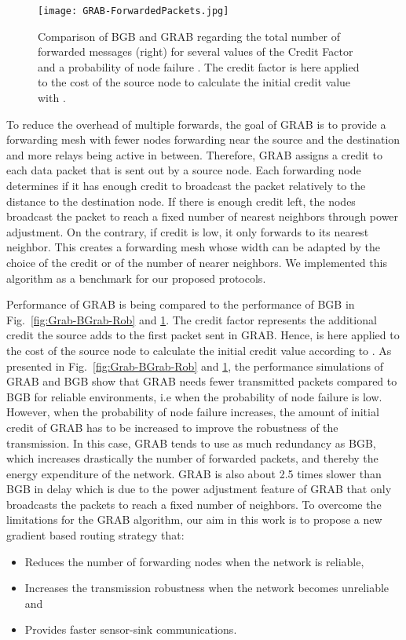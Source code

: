 \documentclass[journal, peerreview, onecolumn, draftcls]{IEEEtran}
\begin{document}
\begin{figure}
    \centering
    \texttt{[image: GRAB-ForwardedPackets.jpg]}
    \caption{Comparison of BGB and GRAB regarding the total number of forwarded messages (right) for several values of the Credit Factor  and a probability of node failure . The credit factor  is here applied to the cost of the source node  to calculate the initial credit value  with .}
    \label{fig:Grab-BGrab-For}
\end{figure}

To reduce the overhead of multiple forwards, the goal of GRAB is to provide a forwarding mesh with fewer nodes forwarding near the source and the destination and more relays being active in between. Therefore, GRAB assigns a credit to each data packet that is sent out by a source node. Each forwarding node determines if it has enough credit to broadcast the packet relatively to the distance to the destination node. If there is enough credit left, the nodes broadcast the packet to reach a fixed number  of nearest neighbors through power adjustment. On the contrary, if credit is low, it only forwards to its nearest neighbor. This creates a forwarding mesh whose width can be adapted by the choice of the credit or of the number of nearer neighbors. We implemented this algorithm as a benchmark for our proposed protocols.

Performance of GRAB is being compared to the performance of BGB in Fig.~\ref{fig:Grab-BGrab-Rob} and \ref{fig:Grab-BGrab-For}. The credit factor  represents the additional credit the source adds to the first packet sent in GRAB. Hence,  is here applied to the cost of the source node  to calculate the initial credit value  according to .
As presented in Fig.~\ref{fig:Grab-BGrab-Rob} and \ref{fig:Grab-BGrab-For}, the performance simulations of GRAB and BGB show that GRAB needs fewer transmitted packets compared to BGB for reliable environments, i.e when the probability of node failure is low. However, when the probability of node failure increases, the amount of initial credit of GRAB has to be increased to improve the robustness of the transmission. In this case, GRAB tends to use as much redundancy as BGB, which increases drastically the number of forwarded packets, and thereby the energy expenditure of the network.
GRAB is also about 2.5 times slower than BGB in delay which is due to the power adjustment feature of GRAB that only broadcasts the packets to reach a fixed number of  neighbors.
To overcome the limitations for the GRAB algorithm, our aim in this work is to propose a new gradient based routing strategy that:
\begin{itemize}
\item Reduces the number of forwarding nodes when the network is reliable,
\item Increases the transmission robustness when the network becomes unreliable and
\item Provides faster sensor-sink communications.
\end{itemize}
\end{document}
